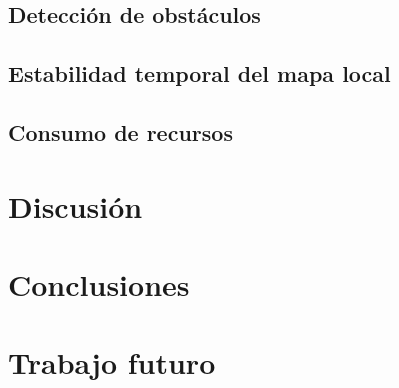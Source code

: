 \section{Detección de obstáculos}

\section{Estabilidad temporal del mapa local}

\section{Consumo de recursos}

\chapter{Discusión}

\chapter{Conclusiones}

\chapter{Trabajo futuro}

